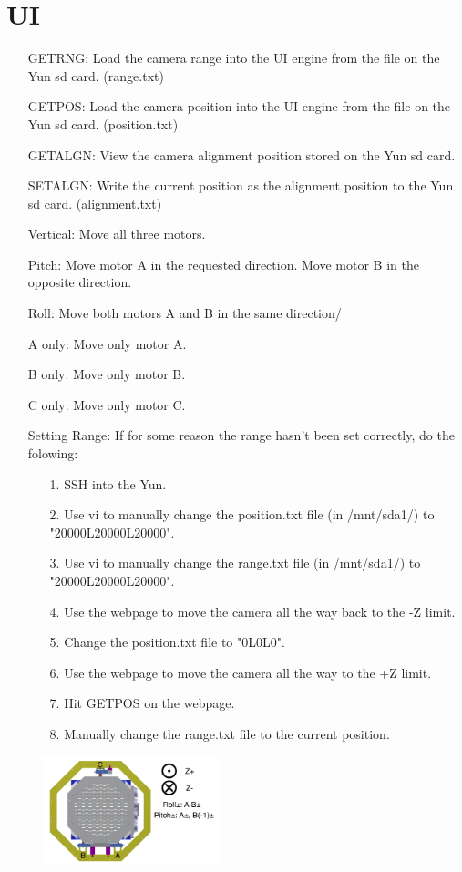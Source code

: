 \documentclass[11pt]{article}
\begin{document}
\section{UI}
\begin{enumerate}
	\item[GETRNG:] Load the camera range into the UI engine from the file on the Yun sd card. (range.txt)
	\item[GETPOS:] Load the camera position into the UI engine from the file on the Yun sd card. (position.txt)
	\item[GETALGN:] View the camera alignment position stored on the Yun sd card.
	\item[SETALGN:] Write the current position as the alignment position to the Yun sd card. (alignment.txt)
	\item[Vertical:] Move all three motors.
	\item[Pitch:] Move motor A in the requested direction. Move motor B in the opposite direction.
	\item[Roll:] Move both motors A and B in the same direction/
	\item[A only:] Move only motor A.
	\item[B only:] Move only motor B.
	\item[C only:] Move only motor C.
	
	\item[Setting Range:] If for some reason the range hasn't been set correctly, do the folowing:
	\begin{enumerate} 
		\item[1.]SSH into the Yun.
		\item[2.]Use vi to manually change the position.txt file (in /mnt/sda1/) to "20000L20000L20000".
		\item[3.]Use vi to manually change the range.txt file (in /mnt/sda1/) to "20000L20000L20000".
		\item[4.]Use the webpage to move the camera all the way back to the -Z limit.
		\item[5.]Change the position.txt file to "0L0L0".
		\item[6.]Use the webpage to move the camera all the way to the +Z limit.
		\item[7.]Hit GETPOS on the webpage.
		\item[8.]Manually change the range.txt file to the current position.
	\end{enumerate}
\end{enumerate}
\begin{figure}[h]
\begin{center}
\includegraphics[width = 2in]{camerapic.png}
\end{center}
\caption{}  
\label{fd2}
\end{figure}
\end{document}
